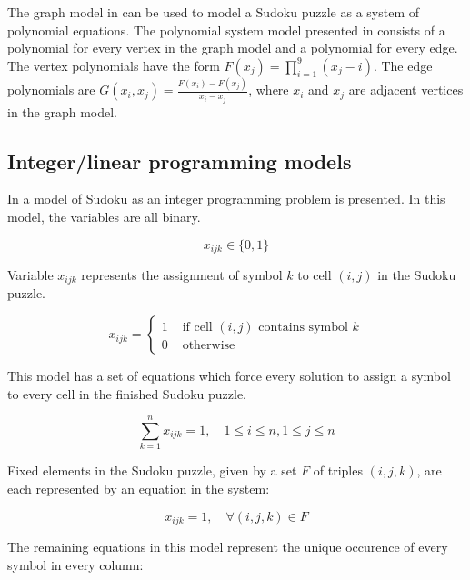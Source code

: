 The graph model in \cite{gagovargaset} can be used to model a Sudoku puzzle as a system of polynomial equations. The polynomial system model presented in \cite{gagovargaset} consists of a polynomial for every vertex in the graph model and a polynomial for every edge. The vertex polynomials have the form $F(x_j) = \prod_{i=1}^{9} (x_j - i)$. The edge polynomials are $G(x_i, x_j) = \frac{F(x_i) - F(x_j)}{x_i - x_j}$, where $x_i$ and $x_j$ are adjacent vertices in the graph model. 

\subsection{Integer/linear programming models}
\label{sec:models:lp}

In \cite{Bartlett2008} a model of Sudoku as an integer programming problem is presented. In this model, the variables are all binary.

\begin{equation}
  x_{ijk} \in \{0, 1\}
\end{equation}

Variable $x_{ijk}$ represents the assignment of symbol $k$ to cell $(i,j)$ in the Sudoku puzzle.

\begin{equation}
 x_{ijk} = 
  \left\lbrace 
   \begin{array}{rl}
    1 & \mbox{ if cell $(i, j)$ contains symbol $k$} \\
    0 & \mbox{ otherwise}
   \end{array}
  \right.
\end{equation}

This model has a set of equations which force every solution to assign a symbol to every cell in the finished Sudoku puzzle.

\begin{equation}
 \sum_{k = 1}^{n} x_{ijk} = 1, \quad 1 \leq i \leq n, 1 \leq j \leq n
\end{equation}

Fixed elements in the Sudoku puzzle, given by a set $F$ of triples $(i,j,k)$, are each represented by an equation in the system:

\begin{equation}
  x_{ijk} = 1, \quad \forall (i,j,k) \in F
\end{equation}

The remaining equations in this model represent the unique occurence of every symbol in every column:

